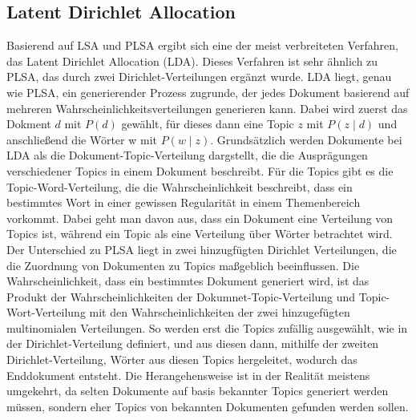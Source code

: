 \documentclass[german,version-2020-11]{uzl-thesis}
\begin{document}
\subsection{Latent Dirichlet Allocation}
Basierend auf LSA und PLSA ergibt sich eine der meist verbreiteten Verfahren, das Latent Dirichlet Allocation (LDA). Dieses Verfahren ist sehr ähnlich zu PLSA, das durch zwei Dirichlet-Verteilungen ergänzt wurde. LDA liegt, genau wie PLSA, ein generierender Prozess zugrunde, der jedes Dokument basierend auf mehreren Wahrscheinlichkeitsverteilungen generieren kann. Dabei wird zuerst das Dokment $d$ mit $P(d)$ gewählt, für dieses dann eine Topic $z$ mit $P(z \mid d)$ und anschließend die Wörter w mit $P(w \mid z)$. Grundsätzlich werden Dokumente bei LDA als die Dokument-Topic-Verteilung dargstellt, die die Ausprägungen verschiedener Topics in einem Dokument beschreibt. Für die Topics gibt es die Topic-Word-Verteilung, die die Wahrscheinlichkeit beschreibt, dass ein bestimmtes Wort in einer gewissen Regularität in einem Themenbereich vorkommt. Dabei geht man davon aus, dass ein Dokument eine Verteilung von Topics ist, während ein Topic als eine Verteilung über Wörter betrachtet wird. Der Unterschied zu PLSA liegt in zwei hinzugfügten Dirichlet Verteilungen, die die Zuordnung von Dokumenten zu Topics maßgeblich beeinflussen.
Die Wahrscheinlichkeit, dass ein bestimmtes Dokument generiert wird, ist das Produkt der Wahrscheinlichkeiten der Dokumnet-Topic-Verteilung und Topic-Wort-Verteilung mit den Wahrscheinlichkeiten der zwei hinzugefügten multinomialen Verteilungen. So werden erst die Topics zufällig ausgewählt, wie in der Dirichlet-Verteilung definiert, und aus diesen dann, mithilfe der zweiten Dirichlet-Verteilung, Wörter aus diesen Topics hergeleitet, wodurch das Enddokument entsteht. Die Herangehensweise ist in der Realität meistens umgekehrt, da selten Dokumente auf basis bekannter Topics generiert werden müssen, sondern eher Topics von bekannten Dokumenten gefunden werden sollen. 

\end{document}
